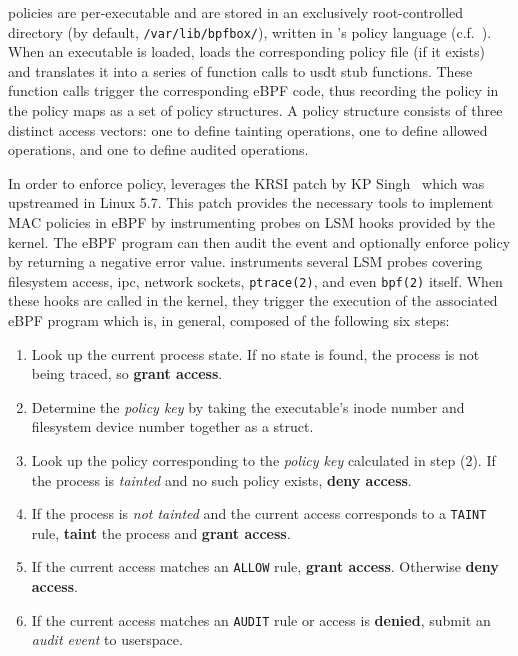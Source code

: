 \bpfbox{} policies are per-executable and are stored in an exclusively root-controlled
directory (by default, \texttt{/var/lib/bpfbox/}), written in \bpfbox{}'s policy language
(c.f.~). When an executable is loaded, \bpfbox{} loads the corresponding
policy file (if it exists) and translates it into a series of function calls to \gls{usdt}
stub functions.  These function calls trigger the corresponding eBPF code, thus recording
the policy in the policy maps as a set of policy structures.  A policy structure consists
of three distinct access vectors: one to define tainting operations, one to define allowed
operations, and one to define audited operations.

In order to enforce policy, \bpfbox{} leverages the KRSI patch by KP
Singh~\cite{singh2019_krsi, corbet2019_krsi} which was upstreamed in Linux
5.7. This patch provides the necessary tools to implement MAC policies in eBPF by
instrumenting probes on LSM hooks provided by the kernel. The eBPF program can then
audit the event and optionally enforce policy by returning a negative error value.
\bpfbox{} instruments several LSM probes covering filesystem access, \gls{ipc}, network
sockets, \texttt{ptrace(2)}, and even \texttt{bpf(2)} itself.  When these hooks are
called in the kernel, they trigger the execution of the associated eBPF program which
is, in general, composed of the following six steps:
\begin{enumerate}
\item Look up the current process state.  If no state is found, the process is
      not being traced, so \textbf{grant access}.
\item Determine the \textit{policy key} by taking the executable's inode
      number and filesystem device number together as a struct.
\item Look up the policy corresponding to the \textit{policy key} calculated in step (2). If the
      process is \textit{tainted} and no such policy exists, \textbf{deny access}.
\item If the process is \textit{not tainted} and the current access corresponds to
      a \texttt{TAINT} rule, \textbf{taint} the process and \textbf{grant access}.
\item If the current access matches an \texttt{ALLOW} rule, \textbf{grant access}.
      Otherwise \textbf{deny access}.
\item If the current access matches an \texttt{AUDIT} rule or access is \textbf{denied},
      submit an \textit{audit event} to userspace.
\end{enumerate}

